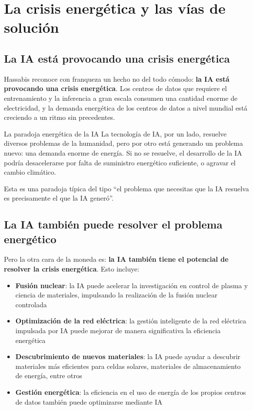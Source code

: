 \documentclass[a4paper]{article}
\begin{document}
\section{La crisis energética y las vías de solución}

\subsection{La IA está provocando una crisis energética}

Hassabis reconoce con franqueza un hecho no del todo cómodo: \textbf{la IA está provocando una crisis energética}. Los centros de datos que requiere el entrenamiento y la inferencia a gran escala consumen una cantidad enorme de electricidad, y la demanda energética de los centros de datos a nivel mundial está creciendo a un ritmo sin precedentes.

\begin{warningbox}{La paradoja energética de la IA}
La tecnología de IA, por un lado, resuelve diversos problemas de la humanidad, pero por otro está generando un problema nuevo: una demanda enorme de energía. Si no se resuelve, el desarrollo de la IA podría desacelerarse por falta de suministro energético suficiente, o agravar el cambio climático.

Esta es una paradoja típica del tipo ``el problema que necesitas que la IA resuelva es precisamente el que la IA generó''.
\end{warningbox}

\subsection{La IA también puede resolver el problema energético}

Pero la otra cara de la moneda es: \textbf{la IA también tiene el potencial de resolver la crisis energética}. Esto incluye:

\begin{itemize}
    \item \textbf{Fusión nuclear}: la IA puede acelerar la investigación en control de plasma y ciencia de materiales, impulsando la realización de la fusión nuclear controlada
    \item \textbf{Optimización de la red eléctrica}: la gestión inteligente de la red eléctrica impulsada por IA puede mejorar de manera significativa la eficiencia energética
    \item \textbf{Descubrimiento de nuevos materiales}: la IA puede ayudar a descubrir materiales más eficientes para celdas solares, materiales de almacenamiento de energía, entre otros
    \item \textbf{Gestión energética}: la eficiencia en el uso de energía de los propios centros de datos también puede optimizarse mediante IA
\end{itemize}
\end{document}
